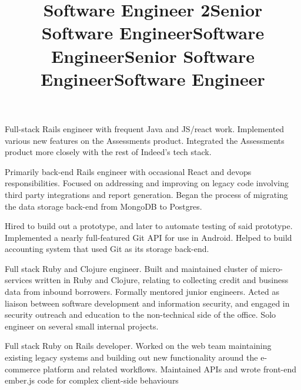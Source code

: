 \documentclass[margin,line,letterpaper]{resume}
\begin{document}
\begin{resume}
  \title{\bf Software Engineer 2}
  \location{}
  \begin{position}
    Full-stack Rails engineer with frequent Java and JS/react work.
    Implemented various new features on the Assessments product.
    Integrated the Assessments product more closely with the rest
    of Indeed's tech stack.
  \end{position}

  \title{\bf Senior Software Engineer}
  \location{}
  \begin{position}
    Primarily back-end Rails engineer with occasional React and
    devops responsibilities. Focused on addressing and improving on
    legacy code involving third party integrations and report
    generation. Began the process of migrating the data storage
    back-end from MongoDB to Postgres.
  \end{position}

  \title{\bf Software Engineer}
  \location{}
  \begin{position}
    Hired to build out a prototype, and later to automate testing of
    said prototype. Implemented a nearly full-featured Git API for use
    in Android. Helped to build accounting system that used Git as
    its storage back-end.
  \end{position}

  \title{\bf Senior Software Engineer}
  \location{}
  \begin{position}
    Full stack Ruby and Clojure engineer. Built and maintained
    cluster of micro-services written in Ruby and Clojure, relating
    to collecting credit and business data from inbound borrowers.
    Formally mentored junior engineers. Acted as liaison between
    software development and information security, and engaged in
    security outreach and education to the non-technical side of
    the office. Solo engineer on several small internal projects.
  \end{position}

  \title{\bf Software Engineer}
  \location{}
  \begin{position}
    Full stack Ruby on Rails developer. Worked on the web team
    maintaining existing legacy systems and building out new
    functionality around the e-commerce platform and related
    workflows. Maintained APIs and wrote front-end ember.js code
    for complex client-side behaviours
  \end{position}



\end{resume}
\end{document}
